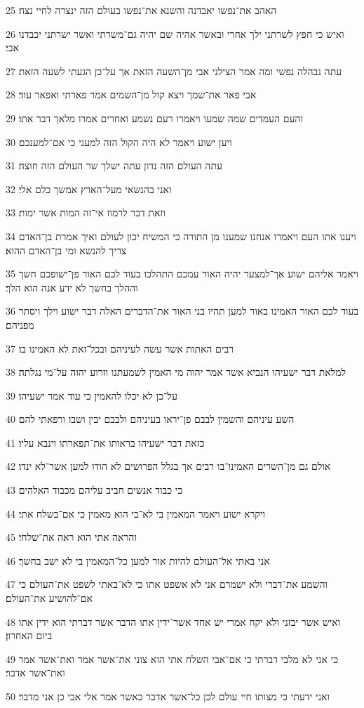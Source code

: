 \par 25 האהב את־נפשו יאבדנה והשנא את־נפשו בעולם הזה ינצרה לחיי נצח׃
\par 26 ואיש כי חפץ לשרתני ילך אחרי ובאשר אהיה שם יהיה גם־משרתי ואשר ישרתני יכבדנו אבי׃
\par 27 עתה נבהלה נפשי ומה אמר הצילני אבי מן־השעה הזאת אך על־כן הגעתי לשעה הזאת׃
\par 28 אבי פאר את־שמך ויצא קול מן־השמים אמר פארתי ואפאר עוד׃
\par 29 והעם העמדים שמה שמעו ויאמרו רעם נשמע ואחרים אמרו מלאך דבר אתו׃
\par 30 ויען ישוע ויאמר לא היה הקול הזה למעני כי אם־למענכם׃
\par 31 עתה העולם הזה נדון עתה ישלך שר העולם הזה חוצה׃
\par 32 ואני בהנשאי מעל־הארץ אמשך כלם אלי׃
\par 33 וזאת דבר לרמוז אי־זה המות אשר ימות׃
\par 34 ויענו אתו העם ויאמרו אנחנו שמענו מן התורה כי המשיח יכון לעולם ואיך אמרת בן־האדם צריך להנשא ומי בן־האדם ההוא׃
\par 35 ויאמר אליהם ישוע אך־למצער יהיה האור עמכם התהלכו בעוד לכם האור פן־ישופכם חשך וההלך בחשך לא ידע אנה הוא הלך׃
\par 36 בעוד לכם האור האמינו באור למען תהיו בני האור את־הדברים האלה דבר ישוע וילך ויסתר מפניהם׃
\par 37 רבים האתות אשר עשה לעיניהם ובכל־זאת לא האמינו בו׃
\par 38 למלאת דבר ישעיהו הנביא אשר אמר יהוה מי האמין לשמעתנו וזרוע יהוה על־מי נגלתה׃
\par 39 על־כן לא יכלו להאמין כי עוד אמר ישעיהו׃
\par 40 השע עיניהם והשמין לבבם פן־יראו בעיניהם ולבבם יבין ושבו ורפאתי להם׃
\par 41 כזאת דבר ישעיהו בראותו את־תפארתו וינבא עליו׃
\par 42 אולם גם מן־השרים האמינו־בו רבים אך בגלל הפרושים לא הודו למען אשר־לא ינדו׃
\par 43 כי כבוד אנשים חביב עליהם מכבוד האלהים׃
\par 44 ויקרא ישוע ויאמר המאמין בי לא־בי הוא מאמין כי אם־בשלח אתי׃
\par 45 והראה אתי הוא ראה את־שלחי׃
\par 46 אני באתי אל־העולם להיות אור למען כל־המאמין בי לא ישב בחשך׃
\par 47 והשמע את־דברי ולא ישמרם אני לא אשפט אתו כי לא־באתי לשפט את־העולם כי אם־להושיע את־העולם׃
\par 48 ואיש אשר יבזני ולא יקח אמרי יש אחד אשר־ידין אתו הדבר אשר דברתי הוא ידין אתו ביום האחרון׃
\par 49 כי אני לא מלבי דברתי כי אם־אבי השלח אתי הוא צוני את־אשר אמר ואת־אשר אמר ואת־אשר אדבר׃
\par 50 ואני ידעתי כי מצותו חיי עולם לכן כל־אשר אדבר כאשר אמר אלי אבי כן אני מדבר׃

